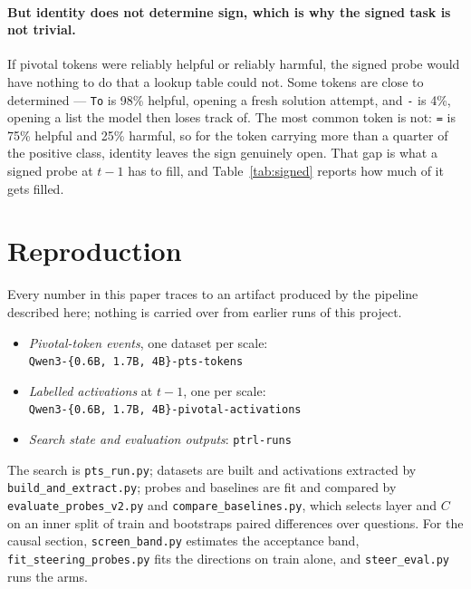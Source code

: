 \documentclass{article}
\begin{document}
\paragraph{But identity does not determine sign, which is why the signed
task is not trivial.} If pivotal tokens were reliably helpful or reliably
harmful, the signed probe would have nothing to do that a lookup table
could not. Some tokens are close to determined --- \texttt{\textvisiblespace To}
is 98\% helpful, opening a fresh solution attempt, and \texttt{\textvisiblespace-}
is 4\%, opening a list the model then loses track of. The most common
token is not: \texttt{\textvisiblespace=} is 75\% helpful and 25\% harmful, so
for the token carrying more than a quarter of the positive class, identity
leaves the sign genuinely open. That gap is what a signed probe at $t-1$
has to fill, and Table~\ref{tab:signed} reports how much of it gets
filled.

\section{Reproduction}

Every number in this paper traces to an artifact produced by the pipeline
described here; nothing is carried over from earlier runs of this project.

\begin{itemize}\setlength{\itemsep}{2pt}
  \item \emph{Pivotal-token events}, one dataset per scale:\\
        \texttt{Qwen3-\{0.6B,\,1.7B,\,4B\}-pts-tokens}
  \item \emph{Labelled activations} at $t{-}1$, one per scale:\\
        \texttt{Qwen3-\{0.6B,\,1.7B,\,4B\}-pivotal-activations}
  \item \emph{Search state and evaluation outputs}: \texttt{ptrl-runs}
\end{itemize}

\noindent
The search is \texttt{pts\_run.py}; datasets are built and activations
extracted by \texttt{build\_and\_extract.py}; probes and baselines are
fit and compared by \texttt{evaluate\_probes\_v2.py} and
\texttt{compare\_baselines.py}, which selects layer and $C$ on an inner
split of train and bootstraps paired differences over questions. For the
causal section, \texttt{screen\_band.py} estimates the acceptance band,
\texttt{fit\_steering\_probes.py} fits the directions on train alone, and
\texttt{steer\_eval.py} runs the arms.
\end{document}
